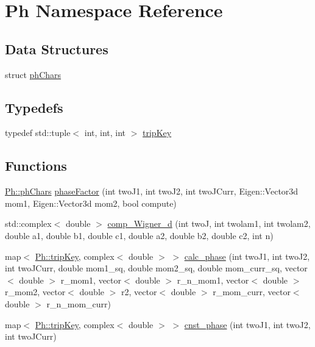 \hypertarget{namespacePh}{}\section{Ph Namespace Reference}
\label{namespacePh}
\subsection*{Data Structures}
\begin{DoxyCompactItemize}
\item 
struct \mbox{\hyperlink{structPh_1_1phChars}{ph\+Chars}}
\end{DoxyCompactItemize}
\subsection*{Typedefs}
\begin{DoxyCompactItemize}
\item 
typedef std\+::tuple$<$ int, int, int $>$ \mbox{\hyperlink{namespacePh_afdd5bf3d7b37625115089ea3048e0cbb}{trip\+Key}}
\end{DoxyCompactItemize}
\subsection*{Functions}
\begin{DoxyCompactItemize}
\item 
\mbox{\hyperlink{structPh_1_1phChars}{Ph\+::ph\+Chars}} \mbox{\hyperlink{namespacePh_ad2fd8f885053b0833441c8388a9218b8}{phase\+Factor}} (int two\+J1, int two\+J2, int two\+J\+Curr, Eigen\+::\+Vector3d mom1, Eigen\+::\+Vector3d mom2, bool compute)
\item 
std\+::complex$<$ double $>$ \mbox{\hyperlink{namespacePh_a65b264daca1c3c0fcc6f1dc55d729cd4}{comp\+\_\+\+Wigner\+\_\+d}} (int twoJ, int twolam1, int twolam2, double a1, double b1, double c1, double a2, double b2, double c2, int n)
\item 
map$<$ \mbox{\hyperlink{namespacePh_afdd5bf3d7b37625115089ea3048e0cbb}{Ph\+::trip\+Key}}, complex$<$ double $>$ $>$ \mbox{\hyperlink{namespacePh_a8662b8eefea46c114386b136878a461c}{calc\+\_\+phase}} (int two\+J1, int two\+J2, int two\+J\+Curr, double mom1\+\_\+sq, double mom2\+\_\+sq, double mom\+\_\+curr\+\_\+sq, vector$<$ double $>$ r\+\_\+mom1, vector$<$ double $>$ r\+\_\+n\+\_\+mom1, vector$<$ double $>$ r\+\_\+mom2, vector$<$ double $>$ r2, vector$<$ double $>$ r\+\_\+mom\+\_\+curr, vector$<$ double $>$ r\+\_\+n\+\_\+mom\+\_\+curr)
\item 
map$<$ \mbox{\hyperlink{namespacePh_afdd5bf3d7b37625115089ea3048e0cbb}{Ph\+::trip\+Key}}, complex$<$ double $>$ $>$ \mbox{\hyperlink{namespacePh_ac0bb2f4b2888c7c304cb6fcb1b5a7ce2}{cnst\+\_\+phase}} (int two\+J1, int two\+J2, int two\+J\+Curr)
\end{DoxyCompactItemize}


